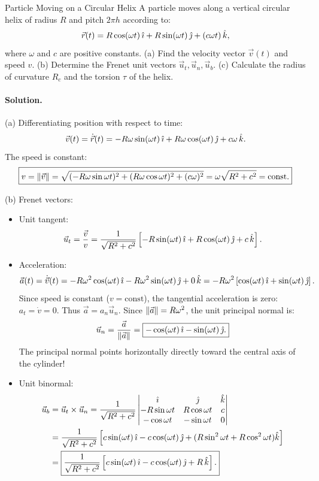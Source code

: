 \begin{workedexample}{Particle Moving on a Circular Helix}
A particle moves along a vertical circular helix of radius $R$ and pitch $2\pi h$ according to:
\[
\vec{r}(t) = R\cos(\omega t)\,\hat{\imath} + R\sin(\omega t)\,\hat{\jmath} + (c\omega t)\,\hat{k},
\]
where $\omega$ and $c$ are positive constants.
(a) Find the velocity vector $\vec{v}(t)$ and speed $v$.
(b) Determine the Frenet unit vectors $\vec{u}_t, \vec{u}_n, \vec{u}_b$.
(c) Calculate the radius of curvature $R_c$ and the torsion $\tau$ of the helix.

\paragraph{Solution.}

(a) Differentiating position with respect to time:
\[
\vec{v}(t) = \dot{\vec{r}}(t) = -R\omega\sin(\omega t)\,\hat{\imath} + R\omega\cos(\omega t)\,\hat{\jmath} + c\omega\,\hat{k}.
\]
The speed is constant:
\[
\boxed{v = \left\lVert \vec{v} \right\rVert = \sqrt{(-R\omega\sin\omega t)^2 + (R\omega\cos\omega t)^2 + (c\omega)^2} = \omega\sqrt{R^2 + c^2} = \text{const}.}
\]

(b) Frenet vectors:
\begin{itemize}[leftmargin=1.4em,itemsep=2pt]
  \item Unit tangent:
  \[
  \vec{u}_t = \frac{\vec{v}}{v} = \frac{1}{\sqrt{R^2 + c^2}}\left[ -R\sin(\omega t)\,\hat{\imath} + R\cos(\omega t)\,\hat{\jmath} + c\,\hat{k} \right].
  \]
  \item Acceleration:
  \[
  \vec{a}(t) = \dot{\vec{v}}(t) = -R\omega^2\cos(\omega t)\,\hat{\imath} - R\omega^2\sin(\omega t)\,\hat{\jmath} + 0\,\hat{k} = -R\omega^2\left[ \cos(\omega t)\,\hat{\imath} + \sin(\omega t)\,\hat{\jmath} \right].
  \]
  Since speed is constant ($v = \text{const}$), the tangential acceleration is zero: $a_t = \dot{v} = 0$.
  Thus $\vec{a} = a_n\vec{u}_n$. Since $\left\lVert \vec{a} \right\rVert = R\omega^2$, the unit principal normal is:
  \[
  \vec{u}_n = \frac{\vec{a}}{\left\lVert \vec{a} \right\rVert} = \boxed{-\cos(\omega t)\,\hat{\imath} - \sin(\omega t)\,\hat{\jmath}.}
  \]
  The principal normal points horizontally directly toward the central axis of the cylinder!
  \item Unit binormal:
  \begin{align*}
  \vec{u}_b &= \vec{u}_t\times\vec{u}_n = \frac{1}{\sqrt{R^2 + c^2}}\begin{vmatrix} \hat{\imath} & \hat{\jmath} & \hat{k} \\ -R\sin\omega t & R\cos\omega t & c \\ -\cos\omega t & -\sin\omega t & 0 \end{vmatrix} \\
  &= \frac{1}{\sqrt{R^2 + c^2}}\left[ c\sin(\omega t)\,\hat{\imath} - c\cos(\omega t)\,\hat{\jmath} + (R\sin^2\omega t + R\cos^2\omega t)\hat{k} \right] \\
  &= \boxed{\frac{1}{\sqrt{R^2 + c^2}}\left[ c\sin(\omega t)\,\hat{\imath} - c\cos(\omega t)\,\hat{\jmath} + R\,\hat{k} \right].}
  \end{align*}
\end{itemize}


\end{workedexample}
